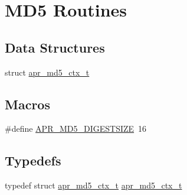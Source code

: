 \hypertarget{group___a_p_r___m_d5}{\section{M\-D5 Routines}
\label{group___a_p_r___m_d5}
}
\subsection*{Data Structures}
\begin{DoxyCompactItemize}
\item 
struct \hyperlink{structapr__md5__ctx__t}{apr\-\_\-md5\-\_\-ctx\-\_\-t}
\end{DoxyCompactItemize}
\subsection*{Macros}
\begin{DoxyCompactItemize}
\item 
\#define \hyperlink{group___a_p_r___m_d5_ga0bb65e74ccdddca6ef75e886084e52dc}{A\-P\-R\-\_\-\-M\-D5\-\_\-\-D\-I\-G\-E\-S\-T\-S\-I\-Z\-E}~16
\end{DoxyCompactItemize}
\subsection*{Typedefs}
\begin{DoxyCompactItemize}
\item 
typedef struct \hyperlink{structapr__md5__ctx__t}{apr\-\_\-md5\-\_\-ctx\-\_\-t} \hyperlink{group___a_p_r___m_d5_gacb4d6bf2cf0a29553a63273ff0a6fe69}{apr\-\_\-md5\-\_\-ctx\-\_\-t}
\end{DoxyCompactItemize}
